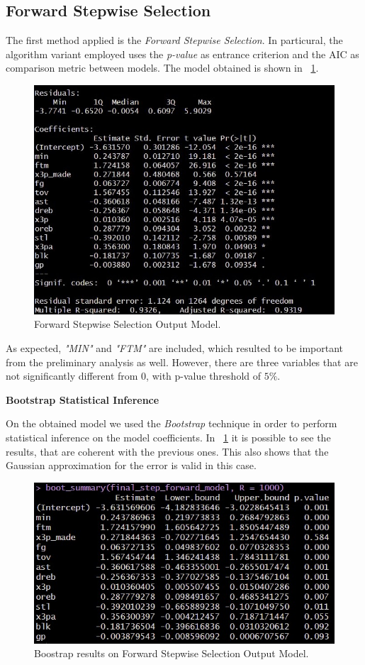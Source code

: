 \subsection{Forward Stepwise Selection}

The first method applied is the \textit{Forward Stepwise Selection}. In particural, the algorithm variant employed uses the \textit{p-value} as entrance criterion and the AIC as comparison metric between models. The model obtained is shown in \Fig~\ref{fig:ForwardModelSummary}.
\begin{figure}[h]
	\centering
	\includegraphics[width=0.35\linewidth]{ImageFiles/Regression/Forward/ForwardModelSummary}
	\caption{Forward Stepwise Selection Output Model.}
	\label{fig:ForwardModelSummary}
\end{figure}

As expected, \textit{"MIN"} and \textit{"FTM"} are included, which resulted to be important from the preliminary analysis as well. However, there are three variables that are not significantly different from 0, with p-value threshold of $5\%$.

\vspace{0.2cm}
\noindent
\textbf{Bootstrap Statistical Inference}

On the obtained model we used the \textit{Bootstrap} technique in order to perform statistical inference on the model coefficients. In \Fig~\ref{fig:ForwardModelSummary} it is possible to see the results, that are coherent with the previous ones. This also shows that the Gaussian approximation for the error is valid in this case.
\begin{figure}[h]
	\centering
	\includegraphics[width=0.4\linewidth]{ImageFiles/Regression/Forward/BootForwardModel}
	\caption{Boostrap results on Forward Stepwise Selection Output Model.}
	\label{fig:BootForwardModel}
\end{figure}

